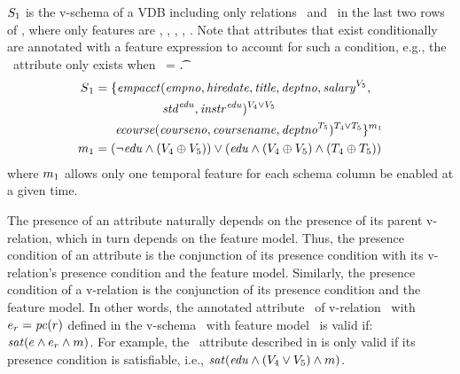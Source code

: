 \begin{example}
\label{eg:vsch}
$\vSch_1$ is the v-schema of a VDB including only relations \empacct\ and \ecourse\ in the last two rows
of , where only features are \vFour, \vFive, \edu, \tFour, \tFive.
Note that attributes that exist conditionally are annotated with a feature expression
to account for such a condition, e.g., the \salary\ attribute only exists when \vFive\ = \t.
%
\begin{align*}
\vSch_1 &=
\{ \empacct ( \empno, \hiredate, \titleatt, \deptno, \annot [\vFive] \salary, \\
&\hspace{55pt} \annot [\edu] \isstudent,
\annot [\edu] \isteacher )^{\vFour \vee \vFive}\\
%
&\hspace{17pt} \ecourse ( \cno, \cname, \annot [\tFive] \deptno )^{\tFour \vee \tFive} \}^{\fModel_1}\\
\fModel_1 &= 
\paran {\neg \edu \wedge \paran {\vFour \oplus \vFive}
 }
\vee
\paran {\edu \wedge \paran {\vFour \oplus \vFive}
\wedge
\paran {\tFour \oplus \tFive}
}
\end{align*}
where \ensuremath{\fModel_1} allows only one temporal feature for each schema column 
be enabled at a given time.
\end{example}

%

The presence of an attribute naturally depends on the presence of its parent v-relation, which in turn depends on the feature model.
%
Thus, the presence condition of an attribute is  
the conjunction of its presence condition with its v-relation's presence condition
and the feature model.
%
Similarly,
the presence condition of a v-relation is the conjunction of its
presence condition and the feature model.
%
In other words, the annotated attribute \optAtt\ of v-relation \vRel\ with 
$\dimMeta_r = \getPC \vRel$
defined in the v-schema \vSch\ with feature model \fModel\
is valid if: $\sat {\dimMeta \wedge \dimMeta_r \wedge \fModel }$.
For example, the \isstudent\ attribute described in \exref{vsch} 
is only valid if its presence condition is
satisfiable, i.e.,
\ensuremath {\sat {\edu \wedge (\vFour \vee \vFive) \wedge \fModel }}.

